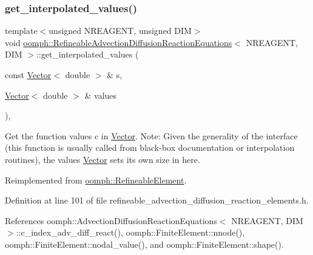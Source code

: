 \subsubsection{\texorpdfstring{get\+\_\+interpolated\+\_\+values()}{get\_interpolated\_values()}\hspace{0.1cm}{\footnotesize\ttfamily [1/2]}}
{\footnotesize\ttfamily template$<$unsigned N\+R\+E\+A\+G\+E\+NT, unsigned D\+IM$>$ \\
void \hyperlink{classoomph_1_1RefineableAdvectionDiffusionReactionEquations}{oomph\+::\+Refineable\+Advection\+Diffusion\+Reaction\+Equations}$<$ N\+R\+E\+A\+G\+E\+NT, D\+IM $>$\+::get\+\_\+interpolated\+\_\+values (\begin{DoxyParamCaption}\item[{const \hyperlink{classoomph_1_1Vector}{Vector}$<$ double $>$ \&}]{s,  }\item[{\hyperlink{classoomph_1_1Vector}{Vector}$<$ double $>$ \&}]{values }\end{DoxyParamCaption})\hspace{0.3cm}{\ttfamily [inline]}, {\ttfamily [virtual]}}



Get the function values c in \hyperlink{classoomph_1_1Vector}{Vector}. Note\+: Given the generality of the interface (this function is usually called from black-\/box documentation or interpolation routines), the values \hyperlink{classoomph_1_1Vector}{Vector} sets its own size in here. 



Reimplemented from \hyperlink{classoomph_1_1RefineableElement_ad9a4f92880668a2373326d8306365c43}{oomph\+::\+Refineable\+Element}.



Definition at line 101 of file refineable\+\_\+advection\+\_\+diffusion\+\_\+reaction\+\_\+elements.\+h.



References oomph\+::\+Advection\+Diffusion\+Reaction\+Equations$<$ N\+R\+E\+A\+G\+E\+N\+T, D\+I\+M $>$\+::c\+\_\+index\+\_\+adv\+\_\+diff\+\_\+react(), oomph\+::\+Finite\+Element\+::nnode(), oomph\+::\+Finite\+Element\+::nodal\+\_\+value(), and oomph\+::\+Finite\+Element\+::shape().

\mbox{\label{classoomph_1_1RefineableAdvectionDiffusionReactionEquations_aa73aae12983b44f1adb2ef19819abf19}} 
